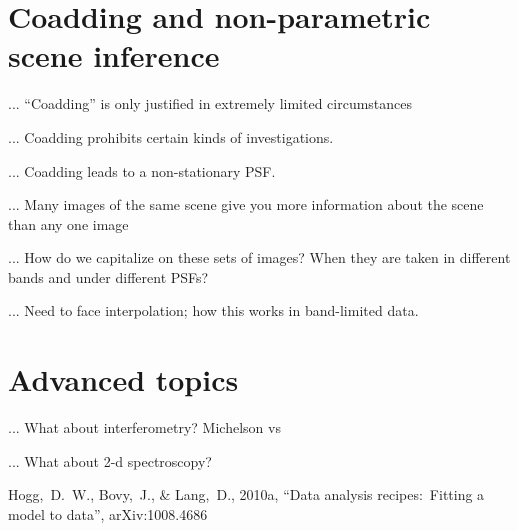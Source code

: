\documentclass[12pt,twoside,pdftex]{article}
\begin{document}
\section{Coadding and non-parametric scene inference}

... ``Coadding'' is only justified in extremely limited circumstances

... Coadding prohibits certain kinds of investigations.

... Coadding leads to a non-stationary PSF.

... Many images of the same scene give you more information about the scene than any one image

... How do we capitalize on these sets of images?  When they are taken in different bands and under different PSFs?

... Need to face interpolation; how this works in band-limited data.

\section{Advanced topics}

... What about interferometry?  Michelson vs 

... What about 2-d spectroscopy?

\clearpage
{}\theendnotes

\clearpage
\begin{thebibliography}{}\raggedright
{}
  Hogg,~D.~W., Bovy,~J., \& Lang,~D., 2010a,
  ``Data analysis recipes:\ Fitting a model to data'', arXiv:1008.4686
\end{thebibliography}
\end{document}
